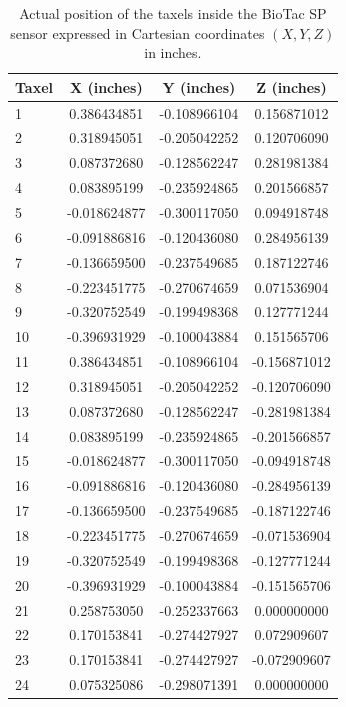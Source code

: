 \begin{table}[!htb]
    \centering
    \caption{Actual position of the taxels inside the BioTac SP sensor expressed in Cartesian coordinates $(X,Y,Z)$ in inches.}
    \begin{tabular}{lccc}
        \hline
        \textbf{Taxel} & \textbf{X (inches)} & \textbf{Y (inches)} & \textbf{Z (inches)}       \\
        \hline
        1     & 0.386434851  & -0.108966104 & 0.156871012  \\
        2     & 0.318945051  & -0.205042252 & 0.120706090  \\
        3     & 0.087372680  & -0.128562247 & 0.281981384  \\
        4     & 0.083895199  & -0.235924865 & 0.201566857  \\
        5     & -0.018624877 & -0.300117050 & 0.094918748  \\
        6     & -0.091886816 & -0.120436080 & 0.284956139  \\
        7     & -0.136659500 & -0.237549685 & 0.187122746  \\
        8     & -0.223451775 & -0.270674659 & 0.071536904  \\
        9     & -0.320752549 & -0.199498368 & 0.127771244  \\
        10    & -0.396931929 & -0.100043884 & 0.151565706  \\
        11    & 0.386434851  & -0.108966104 & -0.156871012 \\
        12    & 0.318945051  & -0.205042252 & -0.120706090 \\
        13    & 0.087372680  & -0.128562247 & -0.281981384 \\
        14    & 0.083895199  & -0.235924865 & -0.201566857 \\
        15    & -0.018624877 & -0.300117050 & -0.094918748 \\
        16    & -0.091886816 & -0.120436080 & -0.284956139 \\
        17    & -0.136659500 & -0.237549685 & -0.187122746 \\
        18    & -0.223451775 & -0.270674659 & -0.071536904 \\
        19    & -0.320752549 & -0.199498368 & -0.127771244 \\
        20    & -0.396931929 & -0.100043884 & -0.151565706 \\
        21    & 0.258753050  & -0.252337663 & 0.000000000  \\
        22    & 0.170153841  & -0.274427927 & 0.072909607  \\
        23    & 0.170153841  & -0.274427927 & -0.072909607 \\
        24    & 0.075325086  & -0.298071391 & 0.000000000\\
        \hline
    \end{tabular}
    \label{table:taxel_coordinates}
\end{table}

